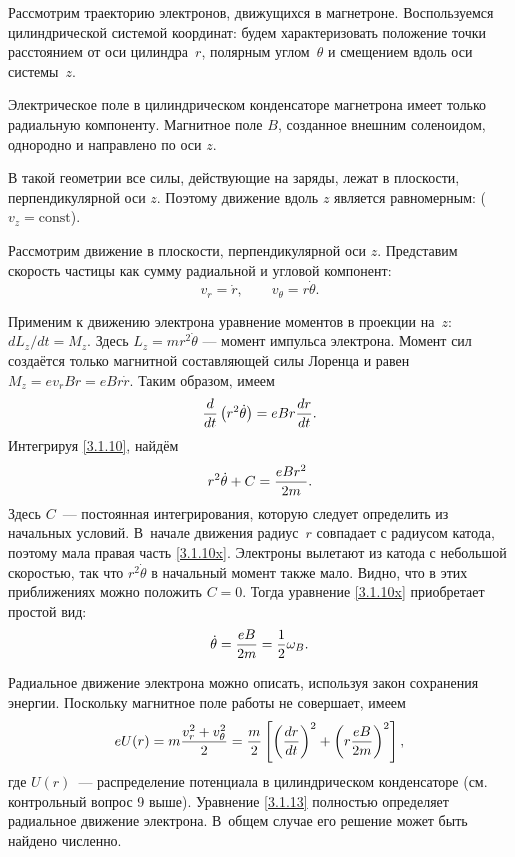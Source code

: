 \begin{labsupplement}

Рассмотрим траекторию электронов, движущихся в магнетроне.
Воспользуемся цилиндрической системой координат: будем характеризовать 
положение точки расстоянием от оси цилиндра~$r$, 
полярным углом~$\theta$ и смещением вдоль оси системы~$z$.

Электрическое поле в цилиндрическом конденсаторе магнетрона
имеет только радиальную компоненту. Магнитное поле $B$, 
созданное внешним соленоидом, однородно и направлено по оси $z$.
 
В такой геометрии все силы, действующие на заряды, лежат в плоскости,
перпендикулярной оси $z$.  Поэтому движение вдоль $z$ является равномерным:
($v_z=\mathrm{const}$).

Рассмотрим движение в плоскости, перпендикулярной оси $z$. 
Представим скорость частицы как сумму радиальной и угловой компонент:
\[
 v_r=\dot{r},\qquad v_{\theta} = r\dot{\theta}.
\]

Применим к движению электрона уравнение моментов в проекции на~$z$:
$dL_z/dt = M_z$.
Здесь $L_z = mr^2 \dot{\theta}$ --- момент импульса электрона.
Момент сил создаётся только магнитной составляющей силы Лоренца и равен
$M_z = e v_r B r =  e B r \dot{r}$. Таким образом, имеем
\begin{equation}
\eqmark{3.1.10}
\frac{d}{dt}\left(r^2\dot{\theta}\right) = eBr\frac{dr}{dt}.
\end{equation}
Интегрируя \eqref{3.1.10}, найдём
\begin{equation}
	r^2\dot{\theta}+C=\frac{eBr^2}{2m}.
	\eqmark{3.1.10x}
\end{equation}
Здесь $C$~--- постоянная интегрирования, которую следует определить из начальных
условий. В~начале движения радиус~$r$ совпадает с радиусом катода,
поэтому мала правая часть \eqref{3.1.10x}. Электроны вылетают из
катода с небольшой скоростью, так что $r^{2}\dot{\theta}$ в начальный момент
также мало. Видно, что в этих приближениях можно положить $C=0$. 
Тогда уравнение \eqref{3.1.10x} приобретает простой вид:
\begin{equation}
	\dot{\theta}=\frac{eB}{2m} = \frac12 \omega_B.
	\eqmark{3.1.12}
\end{equation}

Радиальное движение электрона можно описать, используя закон сохранения
энергии. Поскольку магнитное поле работы не совершает, имеем
\begin{equation}	\eqmark{3.1.13}
eU(r)=m\frac{v_r^2+v_\theta^2}{2} = 
\frac{m}{2} \left[\left(\frac{dr}{dt}\right)^2 + \left(r \frac{eB}{2m}\right)^{2}\right],
\end{equation}
где $U(r)$~--- распределение потенциала в цилиндрическом конденсаторе 
(см. контрольный вопрос 9 выше).
Уравнение \eqref{3.1.13} полностью определяет радиальное 
движение электрона. В~общем случае его решение может быть найдено численно.


\end{labsupplement}
